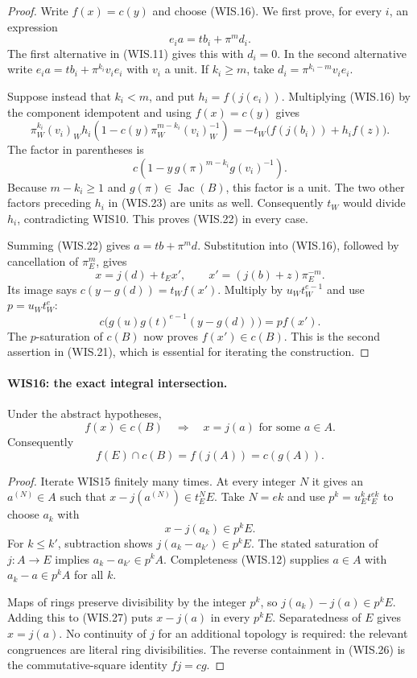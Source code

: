 \documentclass[11pt,a4paper]{article}
\numberwithin{equation}{section}
\theoremstyle{remark}\newtheorem{remark}[theorem]{Remark}
\begin{document}
\begin{proof}
Write $f(x)=c(y)$ and choose (WIS.16).
We first prove, for every $i$, an expression
\[
                         e_i a=tb_i+\pi^md_i.             \tag{WIS.22}
\]
The first alternative in (WIS.11) gives this with $d_i=0$.
In the second alternative write
$e_i a=tb_i+\pi^{k_i}v_i e_i$ with $v_i$ a unit.
If $k_i\geq m$, take $d_i=\pi^{k_i-m}v_i e_i$.

Suppose instead that $k_i<m$, and put $h_i=f(j(e_i))$.
Multiplying (WIS.16) by the component idempotent and
using $f(x)=c(y)$ gives
\[
 \pi_W^{k_i}(v_i)_W h_i
    \left(1-c(y)\pi_W^{m-k_i}(v_i)_W^{-1}\right)
        =-t_W\bigl(f(j(b_i))+h_i f(z)\bigr).                \tag{WIS.23}
\]
The factor in parentheses is
\[
          c\left(1-y\,g(\pi)^{m-k_i}g(v_i)^{-1}\right).
\]
Because $m-k_i\geq1$ and $g(\pi)\in\operatorname{Jac}(B)$,
this factor is a unit. The two other factors preceding
$h_i$ in (WIS.23) are units as well. Consequently $t_W$
would divide $h_i$, contradicting WIS10. This proves
(WIS.22) in every case.

Summing (WIS.22) gives $a=tb+\pi^md$.
Substitution into (WIS.16), followed by cancellation
of $\pi_E^m$, gives
\[
         x=j(d)+t_Ex',\qquad
         x'=(j(b)+z)\pi_E^{-m}.                            \tag{WIS.24}
\]
Its image says $c(y-g(d))=t_W f(x')$. Multiply by
$u_Wt_W^{e-1}$ and use $p=u_Wt_W^e$:
\[
       c\bigl(g(u)g(t)^{e-1}(y-g(d))\bigr)=p f(x').
\]
The $p$-saturation of $c(B)$ now proves $f(x')\in c(B)$.
This is the second assertion in (WIS.21), which is
essential for iterating the construction.
\end{proof}

\paragraph{WIS16: the exact integral intersection.}
\label{claim:WIS16}
Under the abstract hypotheses,
\[
             f(x)\in c(B)\quad\Longrightarrow\quad
                          x=j(a)\text{ for some }a\in A. \tag{WIS.25}
\]
Consequently
\[
                       f(E)\cap c(B)=f(j(A))=c(g(A)).     \tag{WIS.26}
\]

\begin{proof}
Iterate WIS15 finitely many times. At every integer $N$
it gives an $a^{(N)}\in A$ such that
$x-j(a^{(N)})\in t_E^NE$. Take $N=ek$ and use
$p^k=u_E^kt_E^{ek}$ to choose $a_k$ with
\[
                         x-j(a_k)\in p^kE.               \tag{WIS.27}
\]
For $k\leq k'$, subtraction shows
$j(a_k-a_{k'})\in p^kE$. The stated saturation of
$j:A\to E$ implies $a_k-a_{k'}\in p^kA$.
Completeness (WIS.12) supplies $a\in A$ with
$a_k-a\in p^kA$ for all $k$.

Maps of rings preserve divisibility by the integer $p^k$,
so $j(a_k)-j(a)\in p^kE$. Adding this to (WIS.27)
puts $x-j(a)$ in every $p^kE$. Separatedness of $E$
gives $x=j(a)$.
No continuity of $j$ for an additional topology is
required: the relevant congruences are literal ring
divisibilities. The reverse containment in (WIS.26)
is the commutative-square identity $fj=cg$.
\end{proof}
\end{document}
